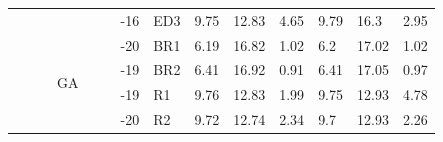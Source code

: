 {\begin{minipage}{\linewidth}
\begin{tabular}{l|l|l|l|c|c|r|l|lll|lll}
                                              &                                          &                                           &                                           &                                            &                                                                                         & -16                                                                                            & ED3                                       & 9.75  & 12.83 & 4.65      & 9.79  & 16.3  & 2.95       \\
  \cline{4-4}\cline{7-14}
                                              &                                          &                                           & \multirow{8}{*}{GA}                       &                                            &                                                                                         & -20                                                                                            & BR1                                       & 6.19  & 16.82 & 1.02      & 6.2   & 17.02 & 1.02       \\
                                              &                                          &                                           &                                           &                                            &                                                                                         & -19                                                                                            & BR2                                       & 6.41  & 16.92 & 0.91      & 6.41  & 17.05 & 0.97       \\
                                              &                                          &                                           &                                           &                                            &                                                                                         & -19                                                                                            & R1                                        & 9.76  & 12.83 & 1.99      & 9.75  & 12.93 & 4.78       \\
                                              &                                          &                                           &                                           &                                            &                                                                                         & -20                                                                                            & R2                                        & 9.72  & 12.74 & 2.34      & 9.7   & 12.93 & 2.26       \\

\end{tabular}
\end{minipage}}
